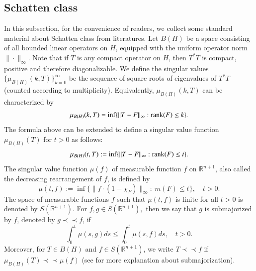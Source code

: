 \documentclass[12pt]{amsart}
\begin{document}
\subsection{Schatten class}\label{Spdef}
In this subsection, for the convenience of readers, we collect some standard material about Schatten class from literatures. Let $B(H)$ be a space consisting of all bounded linear operators on $H$, equipped with the uniform operator norm $\|\cdot\|_\infty$.  Note that if $T$ is any compact operator on $H$, then $T^{*}T$ is compact, positive and therefore diagonalizable. We define the singular values $\{\mu_{B(H)}(k,T)\}_{k=0}^{\infty}$ be the sequence of square roots of eigenvalues of $T^{*}T$ (counted according to multiplicity). Equivalently, $\mu_{B(H)}(k,T)$ can be characterized by
\begin{align*}
\mu_{B(H)}(k,T)=\inf\{\|T-F\|_\infty:{\rm rank}(F)\leq k\}.
\end{align*}
The formula above can be extended to define a singular value function $\mu_{B(H)}(T)$ for $t>0$ as follows:
\begin{align*}
\mu_{B(H)}(t,T):=\inf\{\|T-F\|_\infty:{\rm rank}(F)\leq t\}.
\end{align*}
The singular value function $\mu(f)$ of measurable function $f$ on $\mathbb{R}^{n+1}$, also called the decreasing rearrangement of $f$, is defined by
$$\mu(t,f):=\inf\{\|f\cdot (1-\chi_F)\|_\infty:\ m(F)\leq t\},\quad t>0.$$
The space of measurable functions $f$ such that $\mu(t,f)$ is finite for all $t>0$ is denoted by $S(\mathbb{R}^{n+1})$. For $f,g\in S(\mathbb{R}^{n+1}),$ then we say that $g$ is submajorized by $f$, denoted by $g\prec\prec f$, if
$$\int_0^t \mu(s,g)ds\leq \int_0^t \mu(s,f)ds,\quad t>0.$$
Moreover, for $T\in B(H)$ and $f\in S(\mathbb{R}^{n+1})$, we write $T\prec\prec f$ if $\mu_{B(H)}(T)\prec\prec \mu(f)$ (see \cite[Section 1]{LSZ2} for more explanation about submajorization).
\end{document}
